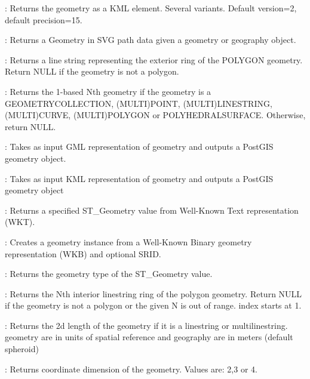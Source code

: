\documentclass[a4paper,11pt,english]{sphinxmanual}
\begin{document}
: Returns the geometry as a KML element. Several variants. Default version=2, default precision=15.

: Returns a Geometry in SVG path data given a geometry or geography object.

: Returns a line string representing the exterior ring of the POLYGON geometry. Return NULL if the geometry is not a polygon.

: Returns the 1-based Nth geometry if the geometry is a GEOMETRYCOLLECTION, (MULTI)POINT, (MULTI)LINESTRING, (MULTI)CURVE, (MULTI)POLYGON or POLYHEDRALSURFACE. Otherwise, return NULL.

: Takes as input GML representation of geometry and outputs a PostGIS geometry object.

: Takes as input KML representation of geometry and outputs a PostGIS geometry object

: Returns a specified ST\_Geometry value from Well-Known Text representation (WKT).

: Creates a geometry instance from a Well-Known Binary geometry representation (WKB) and optional SRID.

: Returns the geometry type of the ST\_Geometry value.

: Returns the Nth interior linestring ring of the polygon geometry. Return NULL if the geometry is not a polygon or the given N is out of range. index starts at 1.

: Returns the 2d length of the geometry if it is a linestring or multilinestring. geometry are in units of spatial reference and geography are in meters (default spheroid)

: Returns coordinate dimension of the geometry. Values are: 2,3 or 4.
\end{document}
